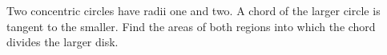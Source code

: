 Two concentric circles have radii one and two. A chord of the larger circle is tangent to the smaller. Find the areas of both regions into which the chord divides the larger disk.
